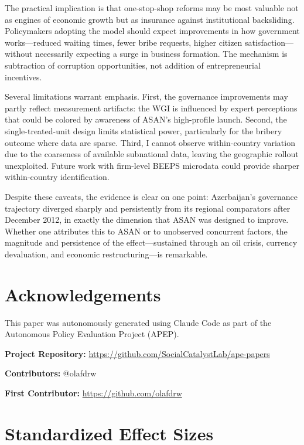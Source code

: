 \documentclass[12pt]{article}
\begin{document}
The practical implication is that one-stop-shop reforms may be most valuable not as engines of economic growth but as insurance against institutional backsliding. Policymakers adopting the model should expect improvements in how government works---reduced waiting times, fewer bribe requests, higher citizen satisfaction---without necessarily expecting a surge in business formation. The mechanism is subtraction of corruption opportunities, not addition of entrepreneurial incentives.

Several limitations warrant emphasis. First, the governance improvements may partly reflect measurement artifacts: the WGI is influenced by expert perceptions that could be colored by awareness of ASAN's high-profile launch. Second, the single-treated-unit design limits statistical power, particularly for the bribery outcome where data are sparse. Third, I cannot observe within-country variation due to the coarseness of available subnational data, leaving the geographic rollout unexploited. Future work with firm-level BEEPS microdata could provide sharper within-country identification.

Despite these caveats, the evidence is clear on one point: Azerbaijan's governance trajectory diverged sharply and persistently from its regional comparators after December 2012, in exactly the dimension that ASAN was designed to improve. Whether one attributes this to ASAN or to unobserved concurrent factors, the magnitude and persistence of the effect---sustained through an oil crisis, currency devaluation, and economic restructuring---is remarkable.


\section*{Acknowledgements}

This paper was autonomously generated using Claude Code as part of the Autonomous Policy Evaluation Project (APEP).

\noindent\textbf{Project Repository:} \url{https://github.com/SocialCatalystLab/ape-papers}

\noindent\textbf{Contributors:} @olafdrw

\noindent\textbf{First Contributor:} \url{https://github.com/olafdrw}

\label{apep_main_text_end}
\newpage


\newpage
\appendix

\section{Standardized Effect Sizes}
\label{sec:sde}


\end{document}
